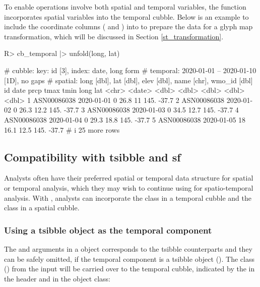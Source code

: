 \documentclass[
  shortnames]{jss}
\begin{document}
To enable operations involve both spatial and temporal variables, the function  incorporates spatial variables into the temporal cubble. Below is an example to include the coordinate columns ( and ) into  to prepare the data for a glyph map transformation, which will be discussed in Section \ref{st_transformation}.

\begin{CodeChunk}
\begin{CodeInput}
R> cb_temporal |> unfold(long, lat)
\end{CodeInput}
\begin{CodeOutput}
# cubble:   key: id [3], index: date, long form
# temporal: 2020-01-01 -- 2020-01-10 [1D], no gaps
# spatial:  long [dbl], lat [dbl], elev [dbl], name [chr], wmo_id [dbl]
  id          date        prcp  tmax  tmin  long   lat
  <chr>       <date>     <dbl> <dbl> <dbl> <dbl> <dbl>
1 ASN00086038 2020-01-01     0  26.8  11    145. -37.7
2 ASN00086038 2020-01-02     0  26.3  12.2  145. -37.7
3 ASN00086038 2020-01-03     0  34.5  12.7  145. -37.7
4 ASN00086038 2020-01-04     0  29.3  18.8  145. -37.7
5 ASN00086038 2020-01-05    18  16.1  12.5  145. -37.7
# i 25 more rows
\end{CodeOutput}
\end{CodeChunk}

\hypertarget{compatibility-with-tsibble-and-sf}{%
\subsection{Compatibility with tsibble and sf}\label{compatibility-with-tsibble-and-sf}}

Analysts often have their preferred spatial or temporal data structure for spatial or temporal analysis, which they may wish to continue using for spatio-temporal analysis. With , analysts can incorporate the  class in a temporal cubble and the  class in a spatial cubble.

\hypertarget{using-a-tsibble-object-as-the-temporal-component}{%
\subsubsection{Using a tsibble object as the temporal component}\label{using-a-tsibble-object-as-the-temporal-component}}

The  and  arguments in a  object corresponds to the tsibble counterparts and they can be safely omitted, if the temporal component is a tsibble object (). The  class () from the input will be carried over to the temporal cubble, indicated by the \code{[tsibble]} in the header and in the object class:
\end{document}
